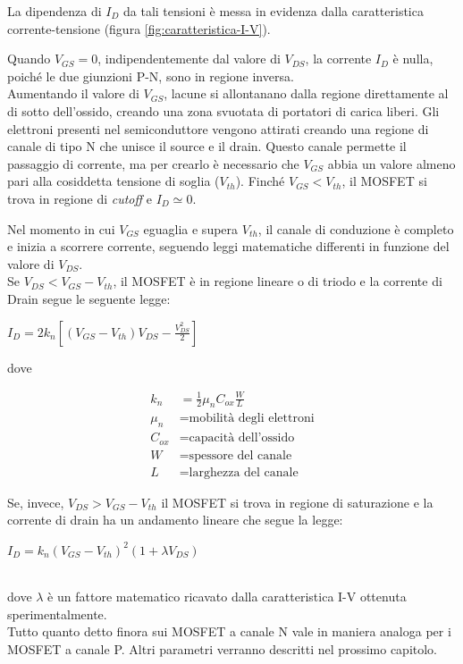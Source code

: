 La dipendenza di $I_D$ da tali tensioni è messa in evidenza dalla caratteristica corrente-tensione (figura \ref{fig:caratteristica-I-V}).

Quando $V_{GS} = 0$, indipendentemente dal valore di $V_{DS}$, la corrente $I_D$ è nulla, poiché le due giunzioni P-N, sono in regione inversa. \\
Aumentando il valore di $V_{GS}$, lacune si allontanano dalla regione direttamente al di sotto dell'ossido, creando una
zona svuotata di portatori di carica liberi. Gli elettroni presenti nel semiconduttore
vengono attirati creando una regione di canale di tipo N che unisce il
source e il drain. Questo canale permette il passaggio di corrente, ma per crearlo è necessario che $V_{GS}$ abbia un valore almeno pari alla cosiddetta tensione di soglia ($V_{th}$). Finché $V_{GS} < V_{th}$, il MOSFET si trova in regione di \emph{cutoff} e $I_D \simeq 0$.

Nel momento in cui $V_{GS}$ eguaglia e supera $V_{th}$, il canale di conduzione è completo e inizia a scorrere corrente, seguendo leggi matematiche differenti in funzione del valore di $V_{DS}$.\\

Se $V_{DS} < V_{GS} -  V_{th}$, il MOSFET è in regione lineare o di triodo e la corrente di Drain segue le seguente legge:\\
\centerline{ $I_D = 2k_n\left[ \left(V_{GS}-V_{th}\right)V_{DS} - \frac{V_{DS}^2}{2}\right]$}

dove

\begin{align*}
   k_n &= \frac{1}{2}\mu_n C_{ox}\frac{W}{L} \\
   \mu_n &= \text{mobilità degli elettroni} \\
   C_{ox} &= \text{capacità dell'ossido} \\
   W &= \text{spessore del canale} \\
   L &= \text{larghezza del canale}
\end{align*}

Se, invece, $V_{DS} > V_{GS} -  V_{th}$ il MOSFET si trova in regione di saturazione e la corrente di drain ha un andamento lineare che segue la legge:\\
\centerline{ $I_D = k_n\left(V_{GS}-V_{th}\right)^2 (1+\lambda V_{DS})$}\\
dove $\lambda$ è un fattore matematico ricavato dalla caratteristica I-V ottenuta sperimentalmente.\\

Tutto quanto detto finora sui MOSFET a canale N vale in maniera analoga per i MOSFET a canale P.
Altri parametri verranno descritti nel prossimo capitolo.

